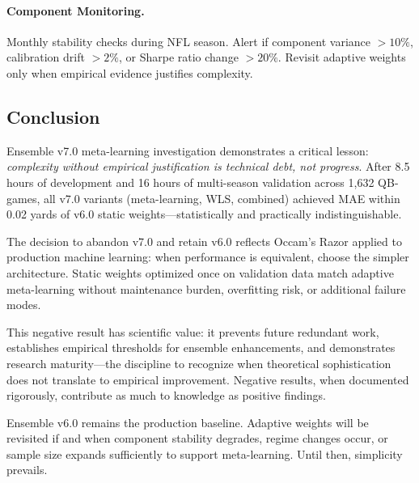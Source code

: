 \paragraph{Component Monitoring.}
Monthly stability checks during NFL season. Alert if component variance $>10\%$, calibration drift $>2\%$, or Sharpe ratio change $>20\%$. Revisit adaptive weights only when empirical evidence justifies complexity.

\subsection{Conclusion}

Ensemble v7.0 meta-learning investigation demonstrates a critical lesson: \textit{complexity without empirical justification is technical debt, not progress}. After 8.5 hours of development and 16 hours of multi-season validation across 1,632 QB-games, all v7.0 variants (meta-learning, WLS, combined) achieved MAE within 0.02 yards of v6.0 static weights---statistically and practically indistinguishable.

The decision to abandon v7.0 and retain v6.0 reflects Occam's Razor applied to production machine learning: when performance is equivalent, choose the simpler architecture. Static weights optimized once on validation data match adaptive meta-learning without maintenance burden, overfitting risk, or additional failure modes.

This negative result has scientific value: it prevents future redundant work, establishes empirical thresholds for ensemble enhancements, and demonstrates research maturity---the discipline to recognize when theoretical sophistication does not translate to empirical improvement. Negative results, when documented rigorously, contribute as much to knowledge as positive findings.

Ensemble v6.0 remains the production baseline. Adaptive weights will be revisited if and when component stability degrades, regime changes occur, or sample size expands sufficiently to support meta-learning. Until then, simplicity prevails.
